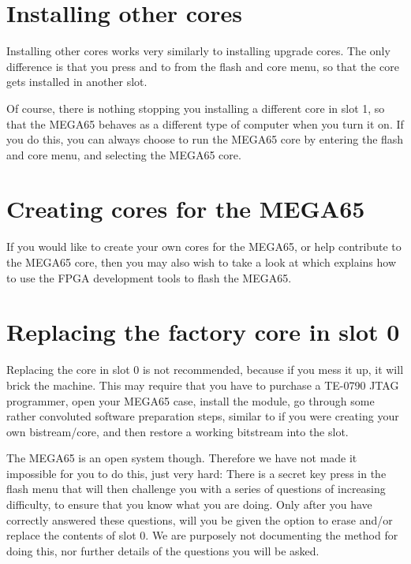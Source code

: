 \section{Installing other cores}

Installing other cores works very similarly to installing upgrade cores. The only difference is that you
press  and  to  from the flash and core menu, so that the core
gets installed in another slot.

Of course, there is nothing stopping you installing a different core
in slot 1, so that the MEGA65 behaves as a different type of computer when you turn it on.  If you do this,
you can always choose to run the MEGA65 core by entering the flash and core menu,  and selecting the MEGA65
core.

\section{Creating cores for the MEGA65}

If you would like to create your own cores for the MEGA65, or help contribute to the MEGA65 core, then
you may also wish to take a look at  which explains how to use the
FPGA development tools to flash the MEGA65.

\section{Replacing the factory core in slot 0}

Replacing the core in slot 0 is not recommended, because if you mess it up, it will brick the machine.
This may require that you have to purchase a TE-0790 JTAG programmer, open your MEGA65 case, install
the module, go through some rather convoluted software preparation steps, similar to if you were
creating your own bistream/core, and then restore a working bitstream into the slot.

The MEGA65 is an open system though. Therefore we have not made it impossible for you to do this,
just very hard: There
is a secret key press in the flash menu that will then challenge you with a series of questions of
increasing difficulty, to ensure that you know what you are doing.  Only after you have correctly
answered these questions, will you be given the option to erase and/or replace the contents of slot 0.
We are purposely not documenting the method for doing this, nor further details of the questions
you will be asked.

